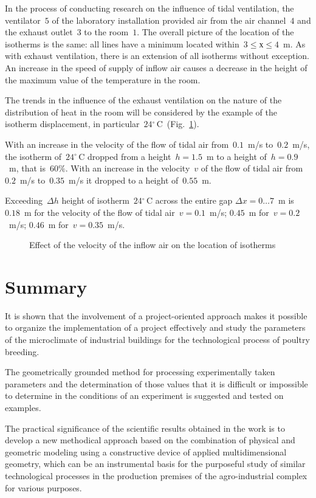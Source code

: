 \documentclass[12pt,twoside]{article}
\newcommand{\FigRef}[2][]{(Fig.~\ref{#2}\textit{#1})}
\newcommand{\degC}{{}^{\circ}\,\text{C}} %
\begin{document}
\begin{JGGarticle}
			In the process of conducting research on the influence of tidal ventilation, the ventilator~$5$ of the laboratory installation provided air from the air channel~$4$ and the exhaust outlet~$3$ to the room~$1$. The overall picture of the location of the isotherms is the same: all lines have a minimum located within~$3 \leq х \leq 4$~m. As with exhaust ventilation, there is an extension of all isotherms without exception. An increase in the speed of supply of inflow air causes a decrease in the height of the maximum value of the temperature in the room.
			
			The trends in the influence of the exhaust ventilation on the nature of the distribution of heat in the room will be considered by the example of the isotherm displacement, in particular~$24\degC$~\FigRef{fig:v}.
			
			With an increase in the velocity of the flow of tidal air from~$0.1$~m/s to~$0.2$~m/s, the isotherm of~$24\degC$ dropped from a height~$h = 1.5$~m to a height of~$h = 0.9$~m, that is~$60\%$. With an increase in the velocity~$v$ of the flow of tidal air from~$0.2$~m/s to~$0.35$~m/s it dropped to a height of~$0.55$~m.
			
			Exceeding~$\Delta h$ height of isotherm~$24\degC$ across the entire gap $\Delta x = 0 \dots 7$~m is~$0.18$~m for the velocity of the flow of tidal air~$v = 0.1$~m/s; $0.45$~m for~$v = 0.2$~m/s; $0.46$~m for~$v = 0.35$~m/s.
			\begin{figure}[!hbt]
				\caption{Effect of the velocity of the inflow air on the location of isotherms}
				\label{fig:v}
			\end{figure}
		\section{Summary}
			It is shown that the involvement of a project-oriented approach makes it possible to organize the implementation of a project effectively and study the parameters of the microclimate of industrial buildings for the technological process of poultry breeding.
			
			The geometrically grounded method for processing experimentally taken parameters and the determination of those values that it is difficult or impossible to determine in the conditions of an experiment is suggested and tested on examples.
			
			The practical significance of the scientific results obtained in the work is to develop a new methodical approach based on the combination of physical and geometric modeling using a constructive device of applied multidimensional geometry, which can be an instrumental basis for the purposeful study of similar technological processes in the production premises of the agro-industrial complex for various purposes.
			

\end{JGGarticle}
\end{document}
